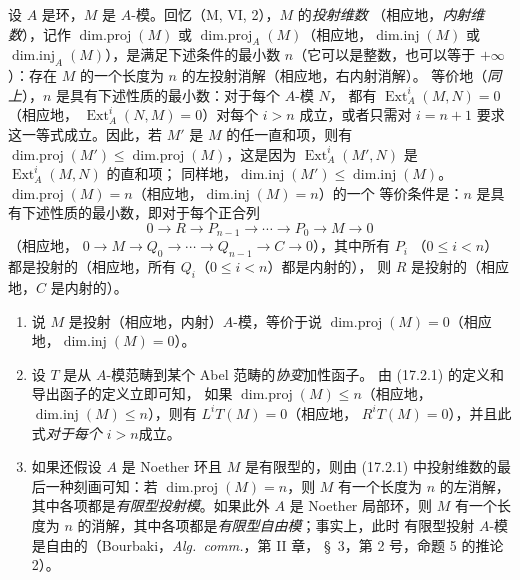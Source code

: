 \begin{env}[17.2.1]
\label{0.17.2.1-fr}
设 $A$ 是环，$M$ 是 $A$-模。回忆（M, VI, 2），$M$ 的\emph{投射维数}
（相应地，\emph{内射维数}），记作 $\operatorname{dim.proj}(M)$ 或
$\operatorname{dim.proj}_A(M)$（相应地，$\operatorname{dim.inj}(M)$ 或
$\operatorname{dim.inj}_A(M)$），是满足下述条件的最小数 $n$（它可以是整数，也可以等于
$+\infty$）：存在 $M$ 的一个长度为 $n$ 的左投射消解（相应地，右内射消解）。
等价地（\emph{同上}），$n$ 是具有下述性质的最小数：对于每个 $A$-模 $N$，
都有 $\operatorname{Ext}^i_A(M,N)=0$（相应地，
$\operatorname{Ext}^i_A(N,M)=0$）对每个 $i>n$ 成立，或者只需对 $i=n+1$
要求这一等式成立。因此，若 $M'$ 是 $M$ 的任一直和项，则有
$\operatorname{dim.proj}(M')\leq\operatorname{dim.proj}(M)$，这是因为
$\operatorname{Ext}^i_A(M',N)$ 是 $\operatorname{Ext}^i_A(M,N)$ 的直和项；
同样地，$\operatorname{dim.inj}(M')\leq\operatorname{dim.inj}(M)$。
$\operatorname{dim.proj}(M)=n$（相应地，$\operatorname{dim.inj}(M)=n$）的一个
等价条件是：$n$ 是具有下述性质的最小数，即对于每个正合列
\[
  0\longrightarrow R\longrightarrow P_{n-1}\longrightarrow\cdots
  \longrightarrow P_0\longrightarrow M\longrightarrow0
\]
（相应地，
$0\longrightarrow M\longrightarrow Q_0\longrightarrow\cdots
\longrightarrow Q_{n-1}\longrightarrow C\longrightarrow0$），其中所有 $P_i$
（$0\leq i<n$）都是投射的（相应地，所有 $Q_i$（$0\leq i<n$）都是内射的），
则 $R$ 是投射的（相应地，$C$ 是内射的）。
\end{env}

\begin{remarks}[17.2.2]
\label{0.17.2.2-fr}
\begin{enumerate}
  \item[\rm (i)] 说 $M$ 是投射（相应地，内射）$A$-模，等价于说
  $\operatorname{dim.proj}(M)=0$（相应地，$\operatorname{dim.inj}(M)=0$）。
  \item[\rm (ii)] 设 $T$ 是从 $A$-模范畴到某个 Abel 范畴的\emph{协变}加性函子。
  由 (17.2.1) 的定义和导出函子的定义立即可知，
  如果 $\operatorname{dim.proj}(M)\leq n$（相应地，
  $\operatorname{dim.inj}(M)\leq n$），则有 $L^iT(M)=0$（相应地，
  $R^iT(M)=0$），并且此式\emph{对于每个 $i>n$}成立。
  \item[\rm (iii)] 如果还假设 $A$ 是 Noether 环且 $M$ 是有限型的，则由
  (17.2.1) 中投射维数的最后一种刻画可知：若
  $\operatorname{dim.proj}(M)=n$，则 $M$ 有一个长度为 $n$ 的左消解，
  其中各项都是\emph{有限型投射模}。如果此外 $A$ 是 Noether 局部环，则 $M$
  有一个长度为 $n$ 的消解，其中各项都是\emph{有限型自由模}；事实上，此时
  有限型投射 $A$-模是自由的（Bourbaki，\emph{Alg.~comm.}，第 II 章，
  \S~3，第 2 号，命题 5 的推论 2）。
\end{enumerate}
\end{remarks}

